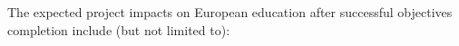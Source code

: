 \documentclass[ngerman,UKenglish,table]{scrbook}
\begin{document}

The expected project impacts on European education after successful objectives completion include (but not limited to):


% 


\end{document}
